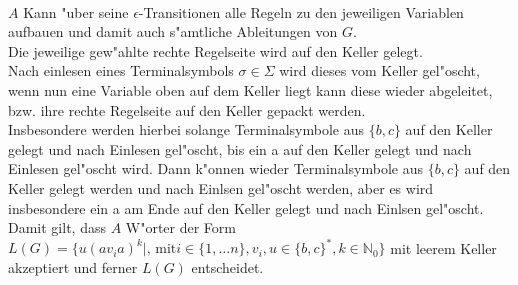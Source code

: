 \documentclass{article}
\newcommand{\eps}{\epsilon}
\begin{document}
\\
$A$ Kann "uber seine $\eps$-Transitionen alle Regeln zu den jeweiligen Variablen
    aufbauen und damit auch s"amtliche Ableitungen von $G$.\\
Die jeweilige gew"ahlte rechte Regelseite wird auf den Keller gelegt.\\
Nach einlesen eines Terminalsymbols $\sigma \in \Sigma$ wird dieses vom Keller
    gel"oscht, wenn nun eine Variable oben auf dem Keller liegt kann diese
    wieder abgeleitet, bzw. ihre rechte Regelseite auf den Keller gepackt
    werden.\\
Insbesondere werden hierbei solange Terminalsymbole aus $\{b,c\}$ auf den Keller
    gelegt und nach Einlesen gel"oscht, bis ein a auf den Keller gelegt und 
    nach Einlesen gel"oscht wird. Dann k"onnen
    wieder Terminalsymbole aus $\{b,c\}$ auf den Keller gelegt werden und 
    nach Einlsen gel"oscht werden, aber es wird insbesondere ein a am Ende auf 
    den Keller gelegt und nach Einlsen gel"oscht. Damit gilt, dass 
    $A$ W"orter der Form $
    L(G) = \{u(av_ia)^k
        |\text{, mit} i \in \{1,\ldots n\}, v_i, u \in \{b,c\}^*, k \in \mathbb{N}_0\}
    $ mit leerem Keller akzeptiert und ferner $L(G)$ entscheidet.\\
\\
    
\end{document}
